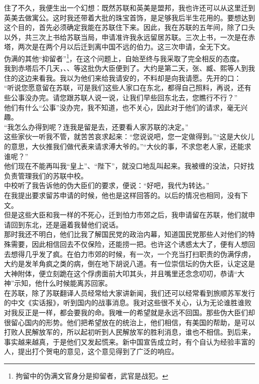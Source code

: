 住了不久，我便生出一个幻想：既然苏联和英美是盟邦，我也许还可以从这里迁到英美去做寓公。这时我还带着大批的珠宝首饰，是足够我后半生花用的。要想达到这个目的，首先必须确定我能在苏联住下来。因此，我在苏联的五年间，除了口头以外，共三次上书给苏联当局，申请准许我永远留居苏联。三次上书，一次是在赤塔，两次是在两个月以后迁到离中国不远的伯力。这三次申请，全无下文。\\

伪满的其他“抑留者”\footnote{拘留中的伪满文官身分是抑留者，武官是战犯。}，在这个问题上，自始至终与我采取了完全相反的态度。\\

我到赤塔后不几天，、、等这批伪大臣便到了。大约是第二天，张、臧、熙等人到我住的这边来看我。我以为他们来给我请安的，不料却是向我请愿。先开的口：\\

“听说您愿意留在苏联，可是我们这些人家口在东北，都得自己照料，再说，还有些公事没办完。请您跟苏联人说一说，让我们早些回东北去，您瞧行不行？”\\

他们有什么“公事”没办完，我不知道，也不关心，因此对于他们的请求，毫无兴趣。\\

“我怎么办得到呢？连我是留是去，还要看人家苏联的决定。”\\

这些家伙一听我不管，就苦苦哀求起来：“您说说吧，您一定做得到。”“这是大伙儿的意思，大伙推我们做代表来请求溥大爷的。”“大伙的事，不求您老人家，还能求谁呢？”\\

他们现在不能再叫我“皇上”、“陛下”，就没口地乱叫起来。我被缠的没法，只好找负责管理我们的苏联中校。\\

中校听了我告诉他的伪大臣们的要求，便说：“好吧，我代为转达。”\\

在我提出要求留苏申请的时候，他也是这样回答的。以后的情况也相同，没有下文。\\

但是这些大臣和我一样的不死心，迁到怕力市郊之后，我申请留在苏联，他们就申请回到东北，还是逼着我替他们说话。\\

那时我还不明白，他们比我了解国民党的政治内幕，知道国民党那些人对他们的特殊需要，因此相信回去不仅保险，还能捞一把。也许这个诱惑太大了，便有人想回去想得几乎发了疯。在伯力市郊的时候，有一次，一个充当打扫职责的伪满俘虏，大约是发羊角疯之类的病，倒在地下胡说八道。有一位崇信坛的伪大臣，认定这是大神附体，便立刻跪在这个俘虏面前大叩其头，并且嘴里还念念叨叨，恭请“大神”示知，他什么时候能离苏回家。\\

在苏联，除了苏联翻译人员经常给大家讲新闻，我们还可以经常看到旅顺苏军发行的中文《实话报》，听到国内的战事消息。我对这些很不关心，认为无论谁胜谁败对我反正是一样，都会要我的命。我唯一的希望就是永远不回国。那些伪大臣们却很留心国内的形势。他们把希望放在的统治上，他们相信，有美国的帮助，是可以打败人民解放军的，所以起初听到人民解放军的胜利消息，谁也不相信。到后来，事实越来越真，于是他们又发起慌来。新中国宣告成立时，有个自认为经验丰富的人，提出打个贺电的意见，这个意见得到了广泛的响应。
